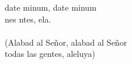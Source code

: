 \begin{cancion}%
	date minum, date minum\\
	nes ntes, ela.\\
	\jump\\
(Alabad al Señor, alabad al Señor\\
 todas las gentes, aleluya)\\
\end{cancion}%
